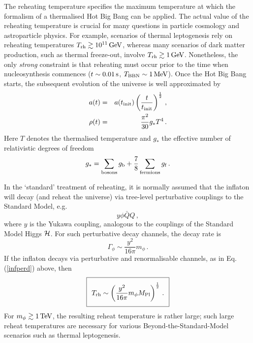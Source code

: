 The reheating temperature specifies the maximum temperature at which the formalism of a thermalised Hot Big Bang can be applied. The actual value of the reheating temperature is crucial for many questions in particle cosmology and astroparticle physics. For example, scenarios of thermal leptogenesis rely on reheating temperatures $T_{\rm rh} \gtrsim 10^{11}\,\rm{GeV}$, whereas many scenarios of dark matter production, such as thermal freeze-out, involve $T_{\rm rh} \gtrsim 1\,\rm{GeV}$. Nonetheless, the only \emph{strong} constraint is that reheating must occur prior to the time when nucleosynthesis commences ($t \sim 0.01\,\hbox{s}$, $T_{\rm BBN} \sim 1 \, \rm{MeV}$). Once the Hot Big Bang starts, the subsequent evolution of the universe is well approximated by
\begin{eqnarray}
a(t) & = & a(t_{\rm init}) \left( \frac{t}{t_{\rm init}} \right)^{\frac12}\,, \nonumber \\
\rho(t) & = & \frac{\pi^2}{30} g_* T^4\,.
\end{eqnarray}
Here $T$ denotes the thermalised temperature and $g_*$ the effective number of relativistic degrees of freedom
\begin{equation}
g_* = \sum_{\rm bosons} g_{\rm b}  + \frac78 \sum_{\rm fermions} g_{\rm f}\,.
\end{equation}

In the `standard' treatment of reheating, it is normally assumed that the inflaton will decay (and reheat the universe) via tree-level perturbative couplings to the Standard Model, e.g. 
\begin{equation}
y \phi \bar{Q} Q\,,
\label{infperd}
\end{equation}
where $y$ is the Yukawa coupling, analogous to the couplings of the Standard Model Higgs ${\cal H}$. For such perturbative decay channels, the decay rate is
\begin{equation}
\Gamma_\phi \sim \frac{y^2}{16 \pi} m_\phi\,.
\label{renormdecay}
\end{equation}
If the inflaton decays via perturbative and renormalisable channels, as in Eq. (\ref{infperd}) above, then
\begin{equation}
\setlength\fboxsep{0.25cm}
\setlength\fboxrule{0.4pt}
\boxed{
T_{\rm rh} \sim  \left( \frac{y^2}{16 \pi} m_\phi M_{\rm Pl} \right)^{\frac12}\,.
}
\end{equation}
For $m_\phi \gtrsim 1\,\hbox{TeV}$, the resulting reheat temperature is rather large; such large reheat temperatures are necessary for various Beyond-the-Standard-Model scenarios such as thermal leptogenesis.

